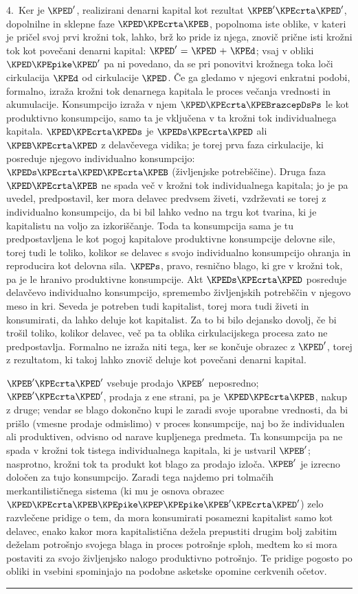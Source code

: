 \documentclass[kapital_02.tex]{subfiles}
\begin{document}
4.\ Ker je \(\KPED'\), realizirani denarni kapital kot rezultat \(\KPEB'\KPEcrta\KPED'\), dopolnilne in sklepne faze \(\KPED\KPEcrta\KPEB\), popolnoma iste oblike, v kateri je pričel svoj prvi krožni tok, lahko, brž ko pride iz njega, znovič prične isti krožni tok kot povečani denarni kapital: \(\KPED' \textrm{ = } \KPED \textrm{ + } \KPEd\); vsaj v obliki \(\KPED\KPEpike\KPED'\) pa ni povedano, da se pri ponovitvi krožnega toka loči cirkulacija \(\KPEd\) od cirkulacije \(\KPED\). Če ga gledamo v njegovi enkratni podobi, formalno, izraža krožni tok denarnega kapitala le proces večanja vrednosti in akumulacije. Konsumpcijo izraža v njem \(\KPED\KPEcrta\KPEBrazcepDsPs\) le kot produktivno konsumpcijo, samo ta je vključena v ta krožni tok individualnega kapitala. \(\KPED\KPEcrta\KPEDs\) \KPEstran je \(\KPEDs\KPEcrta\KPED\) ali \(\KPEB\KPEcrta\KPED\) z delavčevega vidika; je torej prva faza cirkulacije, ki posreduje njegovo individualno konsumpcijo: \(\KPEDs\KPEcrta\KPED\KPEcrta\KPEB\) (življenjske potrebščine). Druga faza \(\KPED\KPEcrta\KPEB\) ne spada več v krožni tok individualnega kapitala; jo je pa uvedel, predpostavil, ker mora delavec predvsem živeti, vzdrževati se torej z individualno konsumpcijo, da bi bil lahko vedno na trgu kot tvarina, ki je kapitalistu na voljo za izkoriščanje. Toda ta konsumpcija sama je tu predpostavljena le kot pogoj kapitalove produktivne konsumpcije delovne sile, torej tudi le toliko, kolikor se delavec s svojo individualno konsumpcijo ohranja in reproducira kot delovna sila. \(\KPEPs\), pravo, resnično blago, ki gre v krožni tok, pa je le hranivo produktivne konsumpcije. Akt \(\KPEDs\KPEcrta\KPED\) posreduje delavčevo individualno konsumpcijo, spremembo življenjskih potrebščin v njegovo meso in kri. Seveda je potreben tudi kapitalist, torej mora tudi živeti in konsumirati, da lahko deluje kot kapitalist. Za to bi bilo dejansko dovolj, če bi trošil toliko, kolikor delavec, več pa ta oblika cirkulacijskega procesa zato ne predpostavlja. Formalno ne izraža niti tega, ker se končuje obrazec z \(\KPED'\), torej z rezultatom, ki takoj lahko znovič deluje kot povečani denarni kapital.

\(\KPEB'\KPEcrta\KPED'\) vsebuje prodajo \(\KPEB'\) neposredno; \(\KPEB'\KPEcrta\KPED'\), prodaja z ene strani, pa je \(\KPED\KPEcrta\KPEB\), nakup z druge; vendar se blago dokončno kupi le zaradi svoje uporabne vrednosti, da bi prišlo (vmesne prodaje odmislimo) v proces konsumpcije, naj bo že individualen ali produktiven, odvisno od narave kupljenega predmeta. Ta konsumpcija pa ne spada v krožni tok tistega individualnega kapitala, ki je ustvaril \(\KPEB'\); nasprotno, krožni tok ta produkt kot blago za prodajo izloča. \(\KPEB'\) je izrecno določen za tujo konsumpcijo. Zaradi tega najdemo pri tolmačih merkantilističnega sistema (ki mu je osnova obrazec \(\KPED\KPEcrta\KPEB\KPEpike\KPEP\KPEpike\KPEB'\KPEcrta\KPED'\)) zelo razvlečene pridige o tem, da mora konsumirati posamezni kapitalist samo kot delavec, enako kakor mora kapitalistična dežela prepustiti drugim bolj zabitim deželam potrošnjo svojega blaga in proces potrošnje sploh, medtem ko si mora postaviti za svojo življenjsko nalogo produktivno potrošnjo. \KPEstran Te pridige pogosto po obliki in vsebini spominjajo na podobne asketske opomine cerkvenih očetov.
\medskip
\hrule
\medskip
\end{document}
